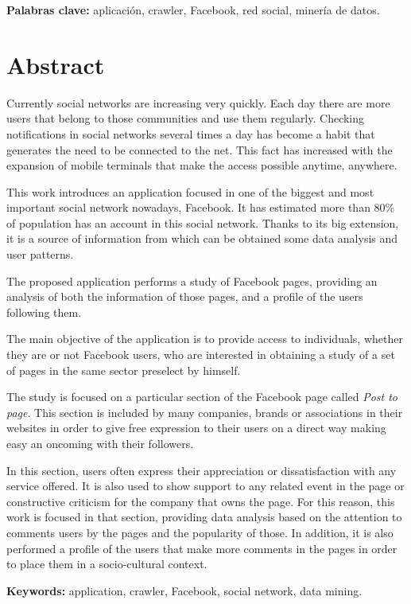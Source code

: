 \textbf{Palabras clave:} aplicación, crawler, Facebook, red social, minería de datos. 

\chapter{Abstract}

Currently social networks are increasing very quickly. Each day there are more users that belong to those communities and use them regularly. Checking notifications in social networks several times a day has become a habit that generates the need to be connected to the net. This fact has increased with the  expansion of mobile terminals that make the access possible anytime, anywhere.

This work introduces an application focused in one of the biggest and most important social network nowadays, Facebook. It has estimated more than 80\% of population has an account in this social network. Thanks to its big extension, it is a source of information from which can be obtained some  data analysis and user patterns.

The proposed application performs a study of Facebook pages, providing an analysis of both the information of those pages, and a profile of the users following them.

The main objective of the application is to provide access to individuals, whether they are or not Facebook users, who are interested in obtaining a study of a set of pages in the same sector preselect by himself.

The study is focused on a particular section of the Facebook page called \textit{Post to page}. This section is included by many companies, brands or associations in their websites in order to give free expression to their users on a direct way making easy an oncoming with their followers.

In this section, users often express their appreciation or dissatisfaction with any service offered. It is also used to show support to any related event in the page or constructive criticism for the company that owns the page. For this reason, this work is focused in that section, providing data analysis based on the attention to comments users by the pages and the popularity of those. In addition, it is also performed a profile of the users that make more comments in the pages in order to place them in a socio-cultural context.

\textbf{Keywords:} application, crawler, Facebook, social network, data mining.